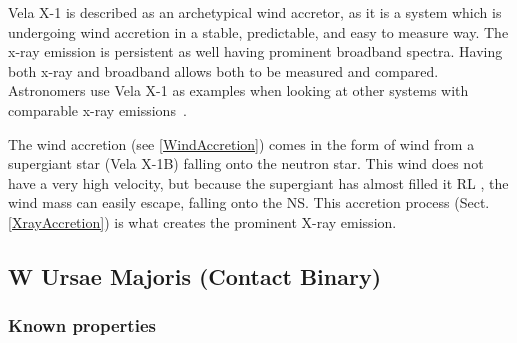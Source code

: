 \documentclass[12pt, a4paper]{article}
\begin{document}
        Vela X-1 is described as an archetypical wind accretor, as it is a system which is undergoing wind accretion in a stable, predictable, and easy to measure way. The x-ray emission is persistent as well having prominent broadband spectra. Having both x-ray and broadband allows both to be measured and compared.  Astronomers use Vela X-1 as examples when looking at other systems with comparable x-ray emissions~\cite{Kretschmar_2021}.
        
        The wind accretion (see \ref{WindAccretion}) comes in the form of wind from a supergiant star (Vela X-1B) falling onto the neutron star. This wind does not have a very high velocity, but because the supergiant has almost filled it RL \cite{Kretschmar_2021}, the wind mass can easily escape, falling onto the NS. This accretion process (Sect. \ref{XrayAccretion}) is what creates the prominent X-ray emission.

        
    \subsection{\centering W Ursae Majoris (Contact Binary)}
        \subsubsection{Known properties}
\end{document}
